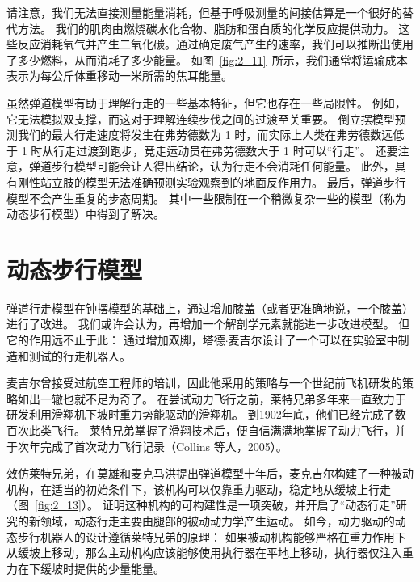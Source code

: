 请注意，我们无法直接测量能量消耗，但基于呼吸测量的间接估算是一个很好的替代方法。
我们的肌肉由燃烧碳水化合物、脂肪和蛋白质的化学反应提供动力。
这些反应消耗氧气并产生二氧化碳。通过确定废气产生的速率，我们可以推断出使用了多少燃料，从而消耗了多少能量。
如图~\ref{fig:2_11}~所示，我们通常将运输成本表示为每公斤体重移动一米所需的焦耳能量。



虽然弹道模型有助于理解行走的一些基本特征，但它也存在一些局限性。
例如，它无法模拟双支撑，而这对于理解连续步伐之间的过渡至关重要。
倒立摆模型预测我们的最大行走速度将发生在弗劳德数为 1 时，而实际上人类在弗劳德数远低于 1 时从行走过渡到跑步，竞走运动员在弗劳德数大于 1 时可以“行走”。
还要注意，弹道步行模型可能会让人得出结论，认为行走不会消耗任何能量。
此外，具有刚性站立肢的模型无法准确预测实验观察到的地面反作用力。
最后，弹道步行模型不会产生重复的步态周期。
其中一些限制在一个稍微复杂一些的模型（称为动态步行模型）中得到了解决。


\section{动态步行模型}

弹道行走模型在钟摆模型的基础上，通过增加膝盖（或者更准确地说，一个膝盖）进行了改进。
我们或许会认为，再增加一个解剖学元素就能进一步改进模型。
但它的作用远不止于此：
通过增加双脚，塔德$\cdot$麦吉尔设计了一个可以在实验室中制造和测试的行走机器人。


麦吉尔曾接受过航空工程师的培训，因此他采用的策略与一个世纪前飞机研发的策略如出一辙也就不足为奇了。
在尝试动力飞行之前，莱特兄弟多年来一直致力于研发利用滑翔机下坡时重力势能驱动的滑翔机。
到1902年底，他们已经完成了数百次此类飞行。
莱特兄弟掌握了滑翔技术后，便自信满满地掌握了动力飞行，并于次年完成了首次动力飞行记录（Collins 等人，2005）。


效仿莱特兄弟，在莫雄和麦克马洪提出弹道模型十年后，麦克吉尔构建了一种被动机构，在适当的初始条件下，该机构可以仅靠重力驱动，稳定地从缓坡上行走（图~\ref{fig:2_13}）。
证明这种机构的可构建性是一项突破，并开启了“动态行走”研究的新领域，动态行走主要由腿部的被动动力学产生运动。
如今，动力驱动的动态步行机器人的设计遵循莱特兄弟的原理：
如果被动机构能够严格在重力作用下从缓坡上移动，那么主动机构应该能够使用执行器在平地上移动，执行器仅注入重力在下缓坡时提供的少量能量。


